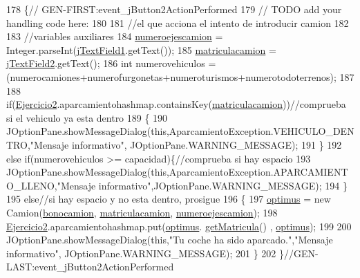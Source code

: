 \begin{DoxyCode}
178                                                                          \{\textcolor{comment}{//
      GEN-FIRST:event\_jButton2ActionPerformed}
179         \textcolor{comment}{// TODO add your handling code here:}
180         
181         \textcolor{comment}{//el que acciona el intento de introducir camion}
182         
183         \textcolor{comment}{//variables auxiliares}
184         \mbox{\hyperlink{classejercicio2_1_1_camion_interfaz_ac62a60d4d186e1ca2a5728b6ad45caa1}{numeroejescamion}} = Integer.parseInt(\mbox{\hyperlink{classejercicio2_1_1_camion_interfaz_ac094ecbee7fcbad6cf54f57cceb73bdb}{jTextField1}}.getText());
185         \mbox{\hyperlink{classejercicio2_1_1_camion_interfaz_a05bc47d68334029c8a8245158ee16b59}{matriculacamion}} = \mbox{\hyperlink{classejercicio2_1_1_camion_interfaz_a08c1f3dc1cf2e8d6f09958c97ecdcd6e}{jTextField2}}.getText();
186         \textcolor{keywordtype}{int} numerovehiculos = (numerocamiones+numerofurgonetas+numeroturismos+numerotodoterrenos);
187         
188         \textcolor{keywordflow}{if}(\mbox{\hyperlink{namespace_ejercicio2}{Ejercicio2}}.aparcamientohashmap.containsKey(\mbox{\hyperlink{classejercicio2_1_1_camion_interfaz_a05bc47d68334029c8a8245158ee16b59}{matriculacamion}}))\textcolor{comment}{//comprueba
       si el vehiculo ya esta dentro}
189         \{
190             JOptionPane.showMessageDialog(\textcolor{keyword}{this},AparcamientoException.VEHICULO\_DENTRO,\textcolor{stringliteral}{"Mensaje informativo"},
      JOptionPane.WARNING\_MESSAGE);
191         \}
192         \textcolor{keywordflow}{else} \textcolor{keywordflow}{if}(numerovehiculos >= capacidad)\{\textcolor{comment}{//comprueba si hay espacio}
193             JOptionPane.showMessageDialog(\textcolor{keyword}{this},AparcamientoException.APARCAMIENTO\_LLENO,\textcolor{stringliteral}{"Mensaje
       informativo"},JOptionPane.WARNING\_MESSAGE);
194         \}
195         \textcolor{keywordflow}{else}\textcolor{comment}{//si hay espacio y no esta dentro, prosigue}
196         \{
197             \mbox{\hyperlink{classejercicio2_1_1_camion_interfaz_a07c8db8092cf51269976606c2b1ffd84}{optimus}} = \textcolor{keyword}{new} Camion(\mbox{\hyperlink{classejercicio2_1_1_camion_interfaz_a77b05c1adddfc9df05f67aae05d794bf}{bonocamion}}, \mbox{\hyperlink{classejercicio2_1_1_camion_interfaz_a05bc47d68334029c8a8245158ee16b59}{matriculacamion}},
      \mbox{\hyperlink{classejercicio2_1_1_camion_interfaz_ac62a60d4d186e1ca2a5728b6ad45caa1}{numeroejescamion}});
198             \mbox{\hyperlink{namespace_ejercicio2}{Ejercicio2}}.aparcamientohashmap.put(\mbox{\hyperlink{classejercicio2_1_1_camion_interfaz_a07c8db8092cf51269976606c2b1ffd84}{optimus}}.
      \mbox{\hyperlink{classejercicio2_1_1_vehiculo_a5dd89b85bb4c8a9da01224fea2b754f0}{getMatricula}}() , \mbox{\hyperlink{classejercicio2_1_1_camion_interfaz_a07c8db8092cf51269976606c2b1ffd84}{optimus}});
199             
200             JOptionPane.showMessageDialog(\textcolor{keyword}{this},\textcolor{stringliteral}{"Tu coche ha sido aparcado."},\textcolor{stringliteral}{"Mensaje informativo"},
      JOptionPane.WARNING\_MESSAGE);
201         \}
202     \}\textcolor{comment}{//GEN-LAST:event\_jButton2ActionPerformed}
\end{DoxyCode}
